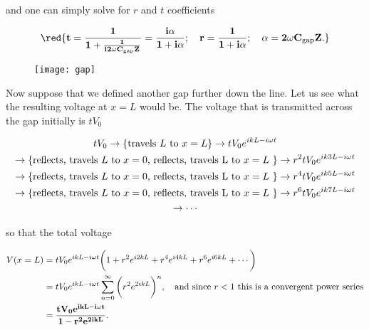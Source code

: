  \noindent and one can simply solve for $ r $ and $ t $ coefficients

 \begin{equation}\label{tLinert}
   \mathbf{\red{t= \frac{1}{1+\frac{1}{i2\omega C_\text{gap}Z}} = \frac{i\alpha}{1+i\alpha};\quad	 r = \frac{1}{1+i\alpha};\quad \alpha = 2\omega C_\text{gap}Z.}}
 \end{equation}

 \begin{figure}
   \centering%
   \texttt{[image: gap]}
 \end{figure}

 Now suppose that we defined another  gap further down the line. Let us
 see what the resulting  voltage at $ x=L $ would  be. The voltage that
 is transmitted across the gap initially is $ tV_0 $

 \begin{multline}\label{tlineMUltiple}
   tV_0 \rightarrow \left\lbrace \text{travels $ L $ to
       $    x=L    $}\right\rbrace    \rightarrow   tV_0e^{ikL-i\omega    t}    \\
   \rightarrow\left\lbrace \text{reflects,  travels $ L  $ to $  x=0 $,
       reflects,  travels  L  to   $  x=L  $  }\right\rbrace\rightarrow
   r^2tV_0e^{ik3L-i\omega t}\\  \rightarrow\left\lbrace \text{reflects,
       travels $ L $ to $ x=0 $, reflects, travels L to $ x=L $
     }\right\rbrace\rightarrow     r^4tV_0e^{ik5L-i\omega      t}     \\
   \rightarrow\left\lbrace \text{reflects,  travels $ L  $ to $  x=0 $,
       reflects,  travels  L  to   $  x=L  $  }\right\rbrace\rightarrow
   r^6tV_0e^{ik7L-i\omega t} \\ \rightarrow\cdots
 \end{multline}

 \noindent so that the total voltage

 \begin{equation}\label{tlineTotalVoltage}
   \begin{aligned}
     V(x=L) & = tV_0e^{ikL-i\omega t}\bigg(1+r^2e^{i2kL}+r^4e^{i4kL}+r^6e^{i6kL}+\cdots\bigg)\\
     & = tV_0e^{ikL-i\omega t}\sum_{n=0}^{\infty}\bigg(r^2e^{2ikL}\bigg)^n, \quad\text{and since $ r<1 $ this is a convergent power series}\\
     & = \mathbf{\frac{tV_0e^{ikL-i\omega t}}{1-r^2e^{2ikL}}.}
   \end{aligned}
 \end{equation}

